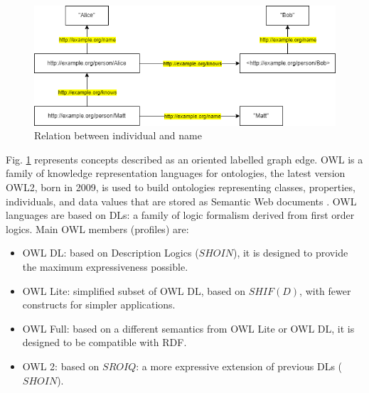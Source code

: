 \begin{figure}[H]
    \centering
    \includegraphics[width=0.9\linewidth]{Figures/fig_85.png}
    \caption{Relation between individual and name}
    \label{fig:85}
\end{figure}
Fig. \ref{fig:85} represents concepts described as an oriented labelled graph edge.
OWL is a family of knowledge representation languages for ontologies, the latest version OWL2, born in 2009, is used to build ontologies representing classes, properties, individuals, and data values that are stored as Semantic Web documents \cite{owl2}. 
OWL languages are based on DLs: a family of logic formalism derived from first order logics. Main OWL members (profiles) are:
\begin{itemize}
    \item OWL DL: based on Description Logics ($SHOIN$), it is designed to provide the maximum expressiveness possible.

    \item OWL Lite: simplified subset of OWL DL, based on $SHIF(D)$, with fewer constructs for simpler applications.

    \item OWL Full: based on a different semantics from OWL Lite or OWL DL, it is designed to be compatible with RDF.

    \item OWL 2: based on $SROIQ$: a more expressive extension of previous DLs ($SHOIN$).
\end{itemize}

